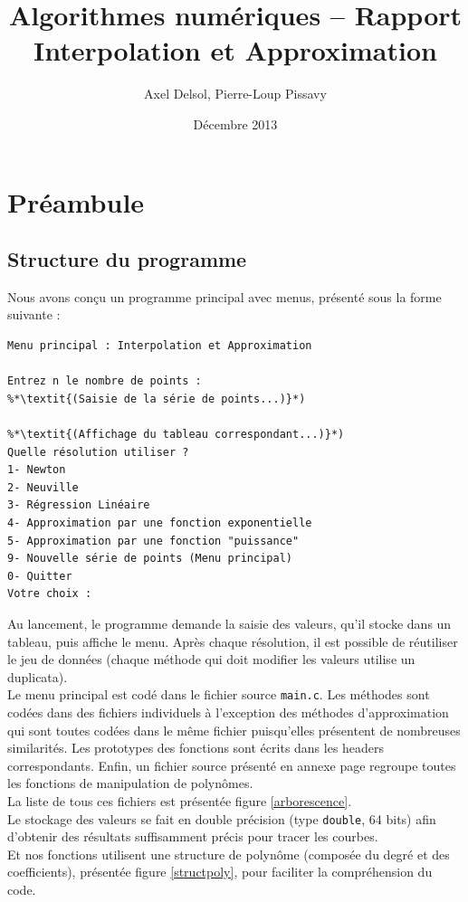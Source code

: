 \documentclass{report}
\title{Algorithmes numériques -- Rapport \\ \vspace{0.5cm}Interpolation et Approximation}
\author{Axel Delsol, Pierre-Loup Pissavy}
\date{Décembre 2013}
\begin{document}
  \maketitle
  \tableofcontents

  \chapter{Préambule}
    \section{Structure du programme}
      Nous avons conçu un programme principal avec menus, présenté sous la forme suivante :
      \begin{lstlisting}[style=apercu, name=Menu Principal]
Menu principal : Interpolation et Approximation

Entrez n le nombre de points : 
%*\textit{(Saisie de la série de points...)}*)

%*\textit{(Affichage du tableau correspondant...)}*)
Quelle résolution utiliser ?
1- Newton
2- Neuville
3- Régression Linéaire
4- Approximation par une fonction exponentielle
5- Approximation par une fonction "puissance"
9- Nouvelle série de points (Menu principal)
0- Quitter
Votre choix :
      \end{lstlisting}
      
      Au lancement, le programme demande la saisie des valeurs, qu'il stocke dans un tableau, puis affiche le menu. Après chaque résolution, il est possible de réutiliser le jeu de données (chaque méthode qui doit modifier les valeurs utilise un duplicata). \\
      
      Le menu principal est codé dans le fichier source \verb"main.c". Les méthodes sont codées dans des fichiers individuels à l'exception des méthodes d'approximation qui sont toutes codées dans le même fichier puisqu'elles présentent de nombreuses similarités. Les prototypes des fonctions sont écrits dans les headers correspondants. Enfin, un fichier source présenté en annexe page \pageref{fonctionspolynome} regroupe toutes les fonctions de manipulation de polynômes.\\
      La liste de tous ces fichiers est présentée figure \ref{arborescence}.\\
      
      Le stockage des valeurs se fait en double précision (type \verb"double", 64 bits) afin d'obtenir des résultats suffisamment précis pour tracer les courbes.\\
      Et nos fonctions utilisent une structure de polynôme (composée du degré et des coefficients), présentée figure \ref{structpoly}, pour faciliter la compréhension du code.\\
      
\end{document}

